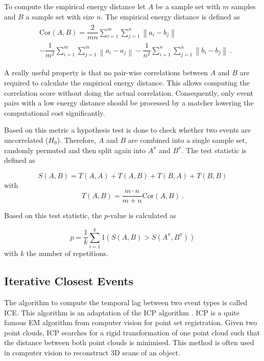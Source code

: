 \documentclass[conference]{IEEEtran}
\theoremstyle{examplestyle}
\begin{document}
To compute the empirical energy distance let \(A\) be a sample set with \(m\) samples and \(B\) a sample set with size \(n\). The empirical energy distance is defined as
\begin{align}
\begin{split}
	& \text{Cor}(A, B) = \dfrac{2}{m n} \sum_{i = 1}^m \sum_{j = 1}^n \left\| a_i - b_j \right\| \\
	& - \dfrac{1}{m^2} \sum_{i = 1}^m \sum_{j = 1}^m \left\| a_i - a_j \right\| - \dfrac{1}{n^2} \sum_{i = 1}^n \sum_{j = 1}^n \left\| b_i - b_j \right\| ~.
\end{split}
\end{align}

A really useful property is that no pair-wise correlations between \(A\) and \(B\) are required to calculate the empirical energy distance. This allows computing the correlation score without doing the actual correlation. Consequently, only event pairs with a low energy distance should be processed by a matcher lowering the computational cost significantly.

Based on this metric a hypothesis test is done to check whether two events are uncorrelated (\(H_0\)).  Therefore, \(A\) and \(B\) are combined into a single sample set, randomly permuted and then split again into \(A^\pi\) and \(B^\pi\). The test statistic is defined as

\begin{equation}
	S(A, B) = T(A, A) + T(A, B) + T(B, A) + T(B, B)
\end{equation}
with
\begin{equation*}
	T(A, B) = \dfrac{m \cdot n}{m + n} \text{Cor}(A, B) ~.
\end{equation*}

Based on this test statistic, the \(p\)-value is calculated as

\begin{equation}
	p = \dfrac{1}{k} \sum_{i = 1}^k 1 \left( S(A, B) > S(A^\pi , B^\pi) \right)
\end{equation}
with \(k\) the number of repetitions.



\subsection{Iterative Closest Events}
\label{sec:ice}

The algorithm to compute the temporal lag between two event types is called \acl{ICE}. This algorithm is an adaptation of the \ac{ICP} algorithm \cite{Besl1992}. \ac{ICP} is a quite famous \ac{EM} algorithm from computer vision for point set registration. Given two point clouds, \ac{ICP} searches for a rigid transformation of one point cloud such that the distance between both point clouds is minimised. This method is often used in computer vision to reconstruct 3D scans of an object.
\end{document}
